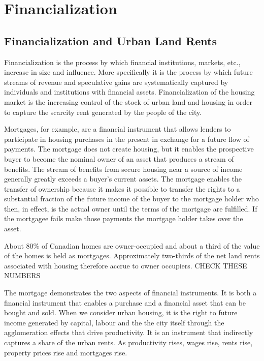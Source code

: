 \chapter{Financialization}


\section{Financialization and Urban Land Rents}

Financialization is the process by which financial institutions, markets, etc., increase in size and influence. More specifically it is the process by which future streams of revenue and speculative gains are systematically captured by individuals and institutions with financial assets. Financialization of the housing market is the increasing control of the stock of urban land and housing in order to capture the scarcity rent generated by the people of the city.  

Mortgages, for example, are a financial instrument that allows lenders to  participate in housing purchases in the present in exchange for a future flow of payments.  The mortgage does not create housing, but it enables the prospective buyer to become the nominal owner of an asset that produces a stream of benefits. The stream of benefits from secure housing near a source of income generally greatly exceeds a buyer's current assets. The mortgage enables the  transfer of ownership because it makes it possible to transfer the rights to a substantial fraction of the future income of the buyer to the mortgage holder who then, in effect, is the actual owner until the terms of the mortgage are fulfilled.  If the mortgagee fails make those payments the mortgage holder  takes over the asset. 

About 80\% of Canadian homes are owner-occupied and about a third of the  value of the homes is held as mortgages. Approximately two-thirds of the net land rents associated with housing therefore accrue to owner occupiers. {\color {red}CHECK THESE NUMBERS } 


The mortgage demonstrates the two aspects of financial instruments. It is both a financial instrument that enables a purchase and a financial asset that can be bought and sold. When we consider urban housing, it is the right to future income generated by capital, labour and the the city itself through the agglomeration effects that drive productivity. It is an instrument that indirectly captures a share of the urban rents. As productivity rises, wages rise, rents rise, property prices rise and mortgages rise. 


